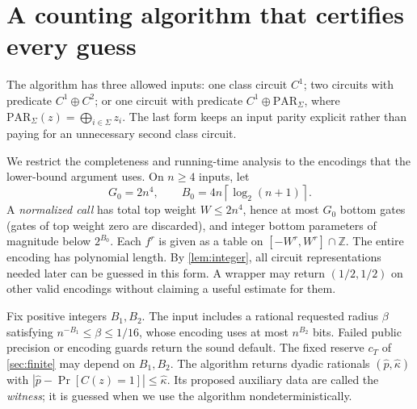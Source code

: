 \documentclass[11pt,letterpaper]{article}
\theoremstyle{definition}
\theoremstyle{remark}
\newcommand{\Z}{\mathbb Z}
\newcommand{\PAR}{\mathrm{PAR}}
\newcommand{\ceil}[1]{\left\lceil #1\right\rceil}
\newcommand{\abs}[1]{\left|#1\right|}
\newcommand{\phat}{\widehat p}
\newcommand{\khat}{\widehat\kappa}
\newcommand{\lgx}{\log_2}
\begin{document}
\section{A counting algorithm that certifies every guess}\label{sec:algorithm}

The algorithm has three allowed inputs:
one class circuit \(C^1\); two circuits with predicate
\(C^1\oplus C^2\); or one circuit with predicate
\(C^1\oplus\PAR_\Sigma\), where
\(\PAR_\Sigma(z)=\bigoplus_{i\in\Sigma}z_i\).
The last form keeps an input parity explicit rather than paying for
an unnecessary second class circuit.

We restrict the completeness and running-time analysis to the
encodings that the lower-bound argument uses. On \(n\ge4\) inputs,
let
\[
 G_0=2n^4,\qquad B_0=4n\ceil{\lgx(n+1)}.
\]
A \emph{normalized call} has total top weight \(W\le2n^4\), hence at
most \(G_0\) bottom gates (gates of top weight zero are discarded),
and integer bottom parameters of magnitude
below \(2^{B_0}\). Each \(f^r\) is given as a table on
\([-W^r,W^r]\cap\Z\). The entire encoding has polynomial length.
By \cref{lem:integer}, all circuit representations needed later can
be guessed in this form. A wrapper may return \((1/2,1/2)\) on other
valid encodings without claiming a useful estimate for them.

Fix positive integers \(B_1,B_2\). The input includes a rational
requested radius \(\beta\) satisfying \(n^{-B_1}\le\beta\le1/16\), whose
encoding uses at most \(n^{B_2}\) bits. Failed public precision or encoding
guards return the sound default. The fixed reserve \(c_T\) of
\cref{sec:finite} may depend on \(B_1,B_2\). The algorithm returns dyadic rationals
\((\phat,\khat)\) with
\(\abs{\phat-\Pr[C(z)=1]}\le\khat\).
Its proposed auxiliary data are called the \emph{witness}; it is
guessed when we use the algorithm nondeterministically.
\end{document}
